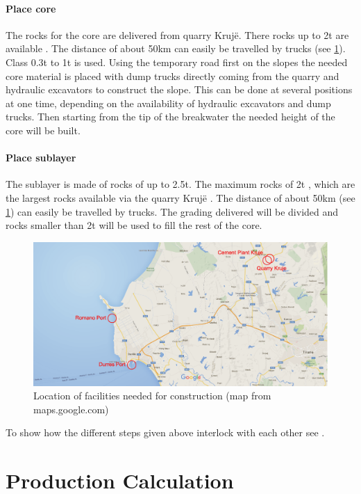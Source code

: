 \paragraph{Place core}
The rocks for the core are delivered from quarry Kruj\"{e}.
There rocks up to 2t are available \citep{MScRomano}.
The distance of about 50km can easily be travelled by trucks (see \ref{fig:mapConstruction}). 
Class 0.3t to 1t is used.
Using the temporary road first on the slopes the needed core material is placed with dump trucks directly coming from the quarry and hydraulic excavators to construct the slope.
This can be done at several positions at one time, depending on the availability of hydraulic excavators and dump trucks.
Then starting from the tip of the breakwater the needed height of the core will be built.

\paragraph{Place sublayer}
The sublayer is made of rocks of up to 2.5t.
The maximum rocks of 2t , which are the largest rocks available via the quarry Kruj\"{e} \citep{MScRomano}.
The distance of about 50km (see \ref{fig:mapConstruction}) can easily be travelled by trucks.
The grading delivered will be divided and rocks smaller than 2t will be used to fill the rest of the core.



\begin{figure}[!htb]
  \center
  \includegraphics[width=\textwidth]{images/mapConstruction} 
  \caption{Location of facilities needed for construction (map from maps.google.com)}
  \label{fig:mapConstruction}
\end{figure}


To show how the different steps given above interlock with each other see .

\section{Production Calculation}